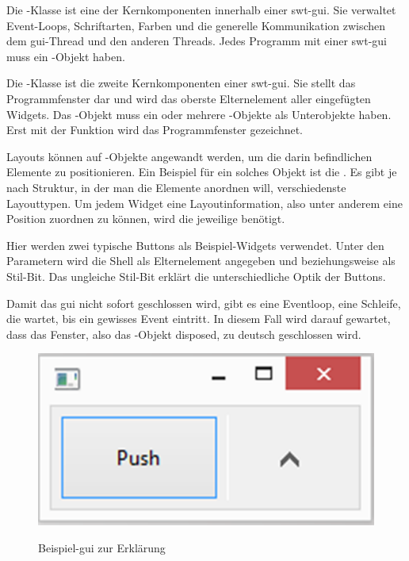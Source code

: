\begin{description}
    Die -Klasse ist eine der Kernkomponenten innerhalb einer \acrshort{swt}-\acrshort{gui}.
    Sie verwaltet Event-Loops, Schriftarten, Farben und die generelle Kommunikation zwischen dem \acrshort{gui}-Thread
    und den anderen Threads. Jedes Programm mit einer \acrshort{swt}-\acrshort{gui} muss ein -Objekt haben.

    Die -Klasse ist die zweite Kernkomponenten einer \acrshort{swt}-\acrshort{gui}.
    Sie stellt das Programmfenster dar und wird das oberste Elternelement aller eingefügten Widgets.
	Das -Objekt muss ein oder mehrere -Objekte als Unterobjekte haben.
    Erst mit der Funktion  wird das Programmfenster gezeichnet.

    Layouts können auf -Objekte angewandt werden, um die darin befindlichen
	Elemente zu positionieren. Ein Beispiel für ein solches Objekt ist die .
    Es gibt je nach Struktur, in der man die Elemente anordnen will, verschiedenste Layouttypen.
    Um jedem Widget eine Layoutinformation, also unter anderem eine Position zuordnen zu können,
	wird die jeweilige  benötigt.

    Hier werden zwei typische Buttons als Beispiel-Widgets verwendet. Unter den Parametern wird die Shell als
    Elternelement angegeben und  beziehungsweise 
    als Stil-Bit. Das ungleiche Stil-Bit erklärt die unterschiedliche Optik der Buttons.

    Damit das \acrshort{gui} nicht sofort geschlossen wird, gibt es eine Eventloop, eine Schleife,
	die wartet, bis ein gewisses Event eintritt. In diesem Fall wird
	darauf gewartet, dass das Fenster, also das -Objekt disposed, zu deutsch
	geschlossen wird.

\end{description}

\begin{figure}[htb]
	\centering
	\includegraphics[]{images/erklaerungsgui.png}
	\label{erklaerungsgui}
  \caption{Beispiel-\acrshort{gui} zur Erklärung}
\end{figure}

